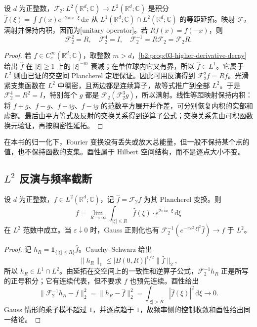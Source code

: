 \begin{theorem}\label{b2:thm:04-unitary}
设 \(d\) 为正整数，\(\mathcal F_2:L^2(\mathbb R^d;\mathbb C)\to L^2(\mathbb R^d;\mathbb C)\) 是积分 \(\widehat f(\xi)=\int f(x)e^{-2\pi\mathrm ix\cdot\xi}\,\mathrm dx\) 从 \(L^1(\mathbb R^d;\mathbb C)\cap L^2(\mathbb R^d;\mathbb C)\) 的等距延拓。映射 \(\mathcal F_2\) 满射并保持内积，因而为[unitary operator]。若 \(Rf(x)=f(-x)\)，则
\[
 \mathcal F_2^2=R,\quad \mathcal F_2^4=I,
 \quad \mathcal F_2^{-1}=R\mathcal F_2=\mathcal F_2R.
\]
\end{theorem}
\begin{proof}
若 \(f\in C_c^\infty(\mathbb R^d;\mathbb C)\)，取整数 \(m>d\)，\cref{b2:prop:03-higher-derivative-decay}给出 \(\widehat f\) 在 \(|\xi|\geq1\) 上的 \(|\xi|^{-m}\) 衰减；在单位球内它又有界，所以 \(\widehat f\in L^1\)。它属于 \(L^2\) 则由已证的交空间 Plancherel 定理保证。因此可用反演得到 \(\mathcal F_2^2f=Rf\)。光滑紧支集函数在 \(L^2\) 中稠密，且两边都是连续算子，故等式推广到全部 \(L^2\)。于是 \(\mathcal F_2^4=R^2=I\)，特别每个 \(g\) 都是 \(\mathcal F_2(\mathcal F_2^3g)\)，所以满射。线性等距映射保持内积：将 \(f+g\)、\(f-g\)、\(f+\mathrm{i}g\)、\(f-\mathrm{i}g\) 的范数平方展开并作差，可分别恢复内积的实部和虚部。最后由平方等式及反射的交换关系得到逆算子公式；交换关系先由可积函数换元验证，再按稠密性延拓。
\end{proof}

在本书的归一化下，Fourier 变换没有丢失或放大总能量，但一般不保持某个点的值，也不保持函数的支集。酉性属于 Hilbert 空间结构，而不是逐点大小不变。

\subsection{\texorpdfstring{\(L^2\)}{L²} 反演与频率截断}
\label{b2:subsec:040104}

\begin{corollary}\label{b2:cor:04-l2-inversion}
设 \(d\) 为正整数，\(f\in L^2(\mathbb R^d;\mathbb C)\)，记 \(\widehat f=\mathcal F_2f\) 为其 Plancherel 变换。则
\[
 f=\lim_{R\to\infty}\int_{|\xi|\leq R}\widehat f(\xi)\cdot e^{2\pi\mathrm{i}x\cdot\xi}\,\mathrm{d}\xi
\]
在 \(L^2\) 范数中成立。当 \(\varepsilon\downarrow0\) 时，Gauss 正则化也有 \(\mathcal F_2^{-1}(e^{-\pi\varepsilon^2|\xi|^2}\widehat f)\to f\) 于 \(L^2\)。
\end{corollary}
\begin{proof}
记 \(h_R=\mathbf1_{\{|\xi|\leq R\}}\widehat f\)。Cauchy--Schwarz 给出
\[
 \|h_R\|_1\leq |B(0,R)|^{1/2}\|\widehat f\|_2,
\]
所以 \(h_R\in L^1\cap L^2\)。由延拓在交空间上的一致性和逆算子公式，\(\mathcal F_2^{-1}h_R\) 正是所写的正号积分；它有连续代表，但不要求 \(f\) 也预先连续。酉性给出
\[
 \|\mathcal F_2^{-1}h_R-f\|_2^2
 =\|h_R-\widehat f\|_2^2
 =\int_{|\xi|>R}|\widehat f(\xi)|^2\,\mathrm{d}\xi\longrightarrow0.
\]
Gauss 情形的乘子模不超过 \(1\)，并逐点趋于 \(1\)，故频率侧的控制收敛和酉性给出同一结论。
\end{proof}

